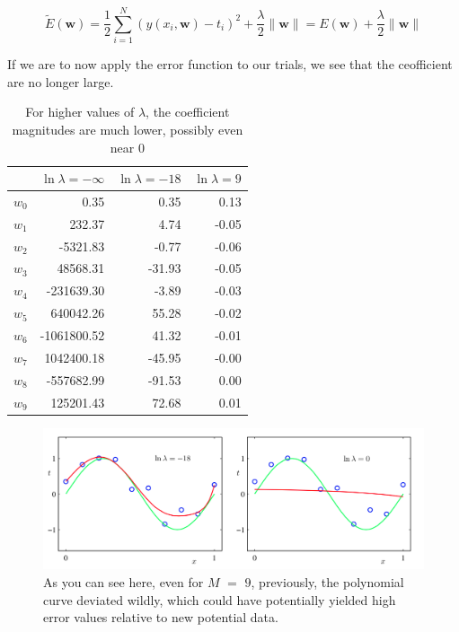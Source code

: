 \documentclass{tufte-handout}
\begin{document}
\begin{equation}
  \widetilde{E}(\mathbf{w}) =
    \frac{1}{2}\sum\limits_{i = 1}^N(y(x_i, \mathbf{w}) - t_i)^2
      + \frac{\lambda}{2}\|\mathbf{w}\|
    = E(\mathbf{w}) + \frac{\lambda}{2}\|\mathbf{w}\|
\end{equation}

If we are to now apply the error function to our trials, we see that the ceofficient are no longer large.

\begin{table}[h]
  \begin{center}
    \begin{tabular}{lrrr}
      \toprule
       & $\ln\lambda = -\infty$ & $\ln\lambda = -18$ & $\ln\lambda = 9$ \\
      \midrule
      $w_0$ &        0.35 &   0.35 &  0.13 \\
      $w_1$ &      232.37 &   4.74 & -0.05 \\
      $w_2$ &    -5321.83 &  -0.77 & -0.06 \\
      $w_3$ &    48568.31 & -31.93 & -0.05 \\
      $w_4$ &  -231639.30 &  -3.89 & -0.03 \\
      $w_5$ &   640042.26 &  55.28 & -0.02 \\
      $w_6$ & -1061800.52 &  41.32 & -0.01 \\
      $w_7$ &  1042400.18 & -45.95 & -0.00 \\
      $w_8$ &  -557682.99 & -91.53 &  0.00 \\
      $w_9$ &   125201.43 &  72.68 &  0.01 \\
      \bottomrule
    \end{tabular}
  \end{center}
  \caption{For higher values of $\lambda$, the coefficient magnitudes are much
    lower, possibly even near $0$}
  \label{tab:font-sizes}
\end{table}

\begin{figure}[h] \label{}
  \includegraphics[width=\linewidth]{lambda.png}
  \caption{As you can see here, even for $M$ $=$ $9$, previously, the polynomial curve deviated wildly, which could have potentially yielded high error values relative to new potential data.}
\end{figure}
\end{document}
